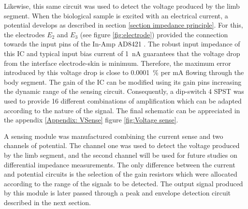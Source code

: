 Likewise, this same circuit was used to detect the voltage produced by the limb segment. When the biological sample is excited with an electrical current, a potential develops as described in section \ref{section impedance principle}. For this, the electrodes $E_2$ and $E_3$ (see figure \ref{fig:electrode}) provided the connection towards the input pins of the In-Amp AD8421 \cite{ad:AD8421}. The robust input impedance of this IC and typical input bias current of \SI{1}{\nA} guarantees that the voltage drop from the interface electrode-skin is minimum. Therefore, the maximum error introduced by this voltage drop is close to \SI{0.0001}{\percent} per mA flowing through the body segment. The gain of the IC can be modified using its gain pins increasing the dynamic range of the sensing circuit. Consequently, a dip-switch 4 SPST was used to provide 16 different combinations of amplification which can be adapted according to the nature of the signal. The final schematic can be appreciated in the appendix \ref{Appendix: VSense} figure \ref{fig:Voltage sense}.

A sensing module was manufactured combining the current sense and two channels of potential. The channel one was used to detect the voltage produced by the limb segment, and the second channel will be used for future studies on differential impedance measurements. The only difference between the current and potential circuits is the selection of the gain resistors which were allocated according to the range of the signals to be detected. The output signal produced by this module is later passed through a peak and envelope detection circuit described in the next section. 



%


